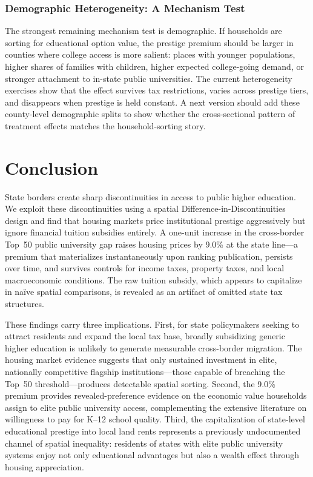 \documentclass[12pt]{article}
\begin{document}
\subsubsection{Demographic Heterogeneity: A Mechanism Test}

The strongest remaining mechanism test is demographic. If households are sorting for educational option value, the prestige premium should be larger in counties where college access is more salient: places with younger populations, higher shares of families with children, higher expected college-going demand, or stronger attachment to in-state public universities. The current heterogeneity exercises show that the effect survives tax restrictions, varies across prestige tiers, and disappears when prestige is held constant. A next version should add these county-level demographic splits to show whether the cross-sectional pattern of treatment effects matches the household-sorting story.


\section{Conclusion}\label{sec:conclusion}

State borders create sharp discontinuities in access to public higher education. We exploit these discontinuities using a spatial Difference-in-Discontinuities design and find that housing markets price institutional prestige aggressively but ignore financial tuition subsidies entirely. A one-unit increase in the cross-border Top~50 public university gap raises housing prices by 9.0\% at the state line---a premium that materializes instantaneously upon ranking publication, persists over time, and survives controls for income taxes, property taxes, and local macroeconomic conditions. The raw tuition subsidy, which appears to capitalize in na\"ive spatial comparisons, is revealed as an artifact of omitted state tax structures.

These findings carry three implications. First, for state policymakers seeking to attract residents and expand the local tax base, broadly subsidizing generic higher education is unlikely to generate measurable cross-border migration. The housing market evidence suggests that only sustained investment in elite, nationally competitive flagship institutions---those capable of breaching the Top~50 threshold---produces detectable spatial sorting. Second, the 9.0\% premium provides revealed-preference evidence on the economic value households assign to elite public university access, complementing the extensive literature on willingness to pay for K--12 school quality. Third, the capitalization of state-level educational prestige into local land rents represents a previously undocumented channel of spatial inequality: residents of states with elite public university systems enjoy not only educational advantages but also a wealth effect through housing appreciation.
\end{document}

